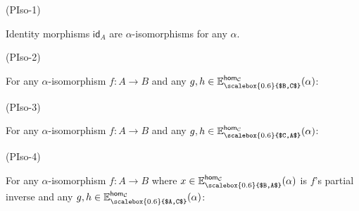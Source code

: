 \documentclass[10pt,a4paper]{article}
\begin{document}
\par\noindent  (PIso-1) 
 
Identity morphisms $\mathsf{id}_{A}$ are $\alpha$-isomorphisms for any $\alpha$.\par
 
 
 
\par\noindent  (PIso-2) 
 
For any $\alpha$-isomorphism $f:A\to B$ and any $g,h\in\mathbb{E}^{\mathsf{hom}_{\mathcal{C}}}_{\scalebox{0.6}{$B,C$}}(\alpha)$:\par
 
\begin{center}\end{center}
 
 
 
\par\noindent  (PIso-3) 
 
For any $\alpha$-isomorphism $f:A\to B$ and any $g,h\in\mathbb{E}^{\mathsf{hom}_{\mathcal{C}}}_{\scalebox{0.6}{$C,A$}}(\alpha)$:\par
 
\begin{center}\end{center}
 
 
 
\par\noindent  (PIso-4) 
 
For any $\alpha$-isomorphism $f:A\to B$ where $x\in\mathbb{E}^{\mathsf{hom}_{\mathcal{C}}}_{\scalebox{0.6}{$B,A$}}(\alpha)$ is $f$’s partial inverse and any $g,h\in\mathbb{E}^{\mathsf{hom}_{\mathcal{C}}}_{\scalebox{0.6}{$A,C$}}(\alpha)$:\par
 
\end{document}
